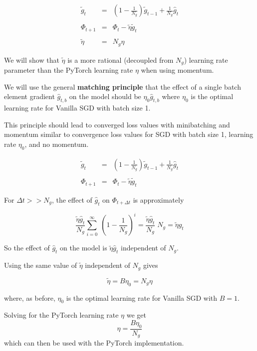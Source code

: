 {\begin{eqnarray*}
\tilde{g}_t & = & \left(1-\frac{1}{N_g}\right)\tilde{g}_{t-1} + \frac{1}{N_g} \hat{g}_t \\
\\
\Phi_{t+1} & = &  \Phi_t - \tilde{\eta}\tilde{g}_t \\
\\
\tilde{\eta} & = & N_g\eta
\end{eqnarray*}

\vfill
We will show that $\tilde{\eta}$ is a more rational (decoupled from $N_g$) learning rate parameter than the PyTorch learning rate $\eta$ when using momentum.


We will use the general {\bf matching principle} that the effect of a single batch element gradient $\hat{g}_{t,b}$ on the model
should be $\eta_0\hat{g}_{t,b}$ where $\eta_0$ is the optimal learning rate
for Vanilla SGD with batch size 1.

\vfill
This principle should lead to converged loss values with minibatching and momentum similar to convergence loss values for SGD with batch size 1, learning rate $\eta_0$, and no momentum.


\begin{eqnarray*}
\tilde{g}_t & = & \left(1-\frac{1}{N_g}\right)\tilde{g}_{t-1} + \frac{1}{N_g} \hat{g}_t \\
\\
\Phi_{t+1} & = &  \Phi_t - \tilde{\eta}\tilde{g}_t
\end{eqnarray*}

For $\Delta t >> N_g$, the effect of $\hat{g}_t$ on $\Phi_{t+\Delta t}$ is approximately

$$\frac{\tilde{\eta}\hat{g}_t}{N_g}\sum_{i = 0}^\infty \;\left(1 - \frac{1}{N_g}\right)^i = \frac{\tilde{\eta}\hat{g}_t}{N_g}\;N_g = \tilde{\eta}\hat{g}_t$$

\vfill
{\color{red} So the effect of $\hat{g}_t$ on the model is $\tilde{\eta}\hat{g}_t$ independent of $N_g$.}


Using the same value of $\tilde{\eta}$ independent of $N_g$ gives

$$\tilde{\eta} = B\eta_0 = N_g\eta$$

where, as before, $\eta_0$ is the optimal learning rate for Vanilla SGD with $B = 1$.

\vfill
Solving for the PyTorch learning rate $\eta$ we get
{\color{red} $$\eta = \frac{B\eta_0}{N_g}$$}
which can then be used with the PyTorch implementation.

}
